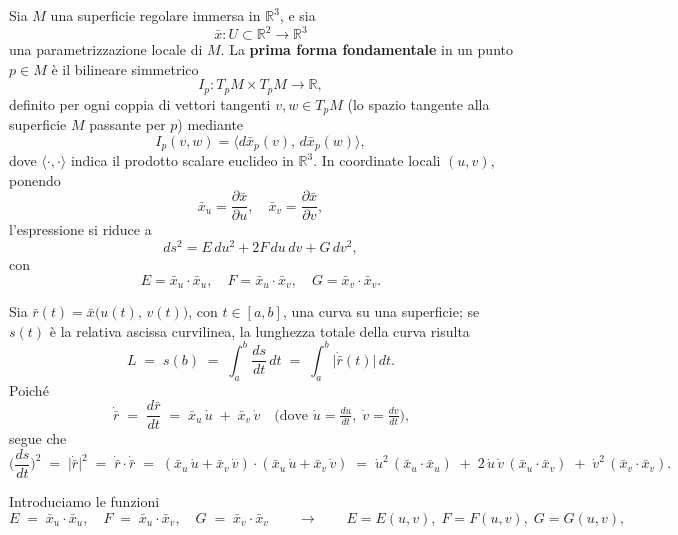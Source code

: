 \begin{definitionblock}
    Sia $M$ una superficie regolare immersa in $\mathbb{R}^3$, e sia 
    \vspace{0.4em}
    $$
    \bar{x}\colon U\subset\mathbb{R}^2 \to \mathbb{R}^3
    $$
    una parametrizzazione locale di $M$. La \textbf{prima forma fondamentale} in un punto $p \in M$ è il bilineare simmetrico
    $$
    I_p\colon T_pM \times T_pM \to \mathbb{R},
    $$
    definito per ogni coppia di vettori tangenti $v, w \in T_pM$ (lo spazio tangente alla superficie $M$ passante per $p$) mediante
    $$
    I_p(v, w) = \langle d\bar{x}_p(v),\, d\bar{x}_p(w) \rangle,
    $$
    dove $\langle \cdot, \cdot \rangle$ indica il prodotto scalare euclideo in $\mathbb{R}^3$. In coordinate locali $(u,v)$, ponendo
    \vspace{0.4em}
    $$
    \bar{x}_u = \frac{\partial \bar{x}}{\partial u},\quad \bar{x}_v = \frac{\partial \bar{x}}{\partial v},
    $$
    l'espressione si riduce a
    $$
    ds^2 = E\,du^2 + 2F\,du\,dv + G\,dv^2,
    $$
    con
    $$
    E = \bar{x}_u \cdot \bar{x}_u,\quad F = \bar{x}_u \cdot \bar{x}_v,\quad G = \bar{x}_v \cdot \bar{x}_v.
    $$
    \end{definitionblock}
    
    \vspace{1em}

Sia $\bar{r}(t) = \bar{x}\bigl(u(t),\,v(t)\bigr)$, con $t\in[a,b]$, una curva su una superficie; se $s(t)$ è la relativa ascissa curvilinea, la lunghezza totale della curva risulta
\vspace{0.4em}
$$
L \;=\; s(b) 
\;=\; \int_a^b \frac{ds}{dt}\,dt 
\;=\; \int_a^b \bigl|\dot{\bar{r}}(t)\bigr| \,dt.
$$
Poiché
$$
\dot{\bar{r}}
\;=\;
\frac{d\bar{r}}{dt}
\;=\;
\bar{x}_u\,\dot{u}
\;+\;
\bar{x}_v\,\dot{v}
\quad\text{(dove }\dot{u} = \tfrac{du}{dt},\; \dot{v} = \tfrac{dv}{dt}\text{),}
$$
segue che
\vspace{0.4em}
$$
\biggl(\frac{ds}{dt}\biggr)^2
\;=\;
\bigl\lvert \dot{\bar{r}}\bigr\rvert^2
\;=\;
\dot{\bar{r}}\cdot \dot{\bar{r}}
\;=\;
(\bar{x}_u\,\dot{u} + \bar{x}_v\,\dot{v}) \cdot (\bar{x}_u\,\dot{u} + \bar{x}_v\,\dot{v})
\;=\;
\dot{u}^2\,(\bar{x}_u\cdot\bar{x}_u)
\;+\;
2\,\dot{u}\,\dot{v}\,(\bar{x}_u\cdot\bar{x}_v)
\;+\;
\dot{v}^2\,(\bar{x}_v\cdot\bar{x}_v).
$$

Introduciamo le funzioni
\vspace{0.4em}
$$
E \;=\; \bar{x}_u \cdot \bar{x}_u,
\quad
F \;=\; \bar{x}_u \cdot \bar{x}_v,
\quad
G \;=\; \bar{x}_v \cdot \bar{x}_v
\qquad\longrightarrow\qquad
E=E(u,v),\; F=F(u,v),\; G=G(u,v),
$$

